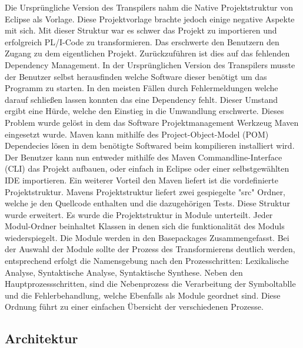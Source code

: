 Die Ursprüngliche Version des Transpilers nahm die Native Projektstruktur von Eclipse als Vorlage. Diese Projektvorlage brachte jedoch einige negative Aspekte mit sich. Mit dieser Struktur war es schwer das Projekt zu importieren und erfolgreich PL/I-Code zu transformieren. Das erschwerte den Benutzern den Zugang zu dem eigentlichen Projekt.
Zurückzuführen ist dies auf das fehlenden Dependency Management. In der Ursprünglichen Version des Transpilers musste der Benutzer selbst herausfinden welche Software dieser benötigt um das Programm zu starten. In den meisten Fällen durch Fehlermeldungen welche darauf schließen lassen konnten das eine Dependency fehlt. Dieser Umstand ergibt eine Hürde, welche den Einstieg in die Umwandlung erschwerte. 
Dieses Problem wurde gelöst in dem das Software Projektmanagement Werkzeug Maven eingesetzt wurde. Maven kann mithilfe des Project-Object-Model (POM) Dependecies lösen in dem benötigte Softwared beim kompilieren installiert wird. Der Benutzer kann nun entweder mithilfe des Maven Commandline-Interface (CLI) das Projekt aufbauen, oder einfach in Eclipse oder einer selbstgewählten IDE importieren.
Ein weiterer Vorteil den Maven liefert ist die vordefinierte Projektstruktur. Mavens Projektstruktur liefert zwei gespiegelte "src" Ordner, welche je den Quellcode enthalten und die dazugehörigen Tests. Diese Struktur wurde erweitert. Es wurde die Projektstruktur in Module unterteilt. Jeder Modul-Ordner beinhaltet Klassen in denen sich die funktionalität des Moduls wiederspiegelt. Die Module werden in den Basepackages Zusammengefasst. Bei der Auswahl der Module sollte der Prozess des Transformierens deutlich werden, entsprechend erfolgt die Namensgebung nach den Prozesschritten: Lexikalische Analyse, Syntaktische Analyse, Syntaktische Synthese. Neben den Hauptprozessschritten, sind die Nebenprozess die Verarbeitung der Symboltablle und die Fehlerbehandlung, welche Ebenfalls als Module geordnet sind. Diese Ordnung führt zu einer einfachen Übersicht der verschiedenen Prozesse.


\subsection{Architektur} 


